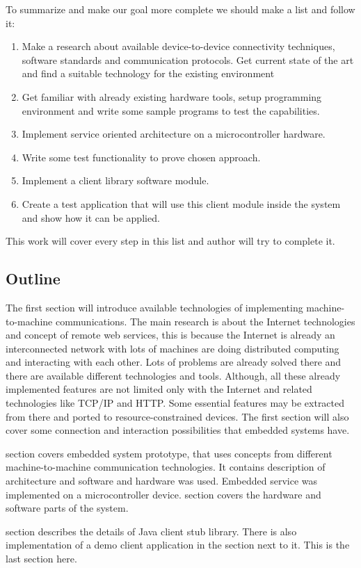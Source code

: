 To summarize and make our goal more complete we should make a list and follow
it:
\begin{enumerate}
  \item Make a research about available device-to-device connectivity
  techniques, software standards and communication protocols. Get current state
  of the art and find a suitable technology for the existing environment
  \item Get familiar with already existing hardware tools, setup programming
  environment and write some sample programs to test the capabilities.
  \item Implement service oriented architecture on a microcontroller hardware.
  \item Write some test functionality to prove chosen approach.
  \item Implement a client library software module.
  \item Create a test application that will use this client module inside the
  system and show how it can be applied. 
\end{enumerate}

This work will cover every step in this list and author will try to complete it. 

\subsection{Outline}

The first section will introduce available technologies of implementing
machine-to-machine communications. 
The main research is about the Internet technologies and concept of remote web services, this is because the Internet
is already an interconnected network with lots of machines are doing distributed
computing and interacting with each other. 
Lots of problems are already solved there and there are available different technologies and tools.
Although, all these already implemented features are not limited  only with the
Internet and related technologies like TCP/IP and HTTP. 
Some essential features may be extracted from there and ported to resource-constrained devices.
The first section will also cover some connection and interaction possibilities that embedded systems have.

 section covers embedded system prototype, that uses
concepts from different machine-to-machine communication technologies. It
contains description of architecture and software and hardware was used. 
Embedded service was implemented on a microcontroller device. 
 section covers the hardware and software parts of the system.

 section describes the details of Java client stub library.
There is also implementation of a demo client application  in the section next to it. 
This is the last section here.


